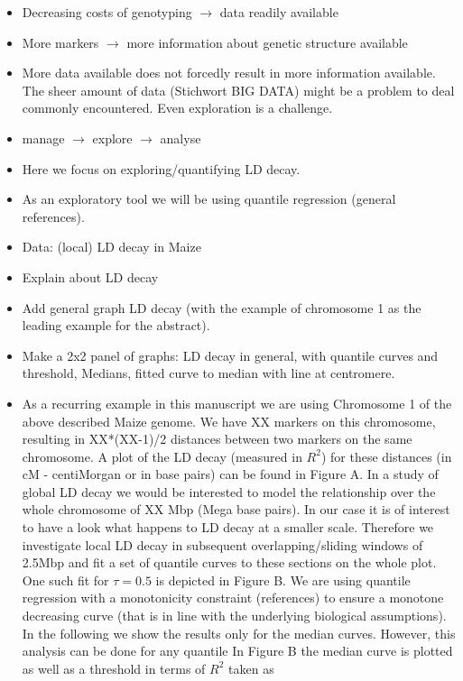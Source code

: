 \documentclass[twoside]{report}
\begin{document}
\begin{itemize}
\item Decreasing costs of genotyping $\rightarrow$ data readily available 
\item More markers $\rightarrow$ more information about genetic structure available
\item More data available does not forcedly result in more information available. The sheer 
	amount of data 
	(Stichwort BIG DATA) might be a problem to deal commonly encountered. Even exploration is 
	a challenge.
\item manage $\rightarrow$ explore $\rightarrow$ analyse
\item Here we focus on exploring/quantifying LD decay.
\item As an exploratory tool we will be using quantile regression (general references).
\item Data: (local) LD decay in Maize
\item Explain about LD decay
\item Add general graph LD decay (with the example of chromosome 1 as the leading example for 
	the abstract).
\item Make a 2x2 panel of graphs: LD decay in general, with quantile curves and threshold, 
	Medians, fitted curve to median with line at centromere.
\item As a recurring example in this manuscript we are using Chromosome 1 of the above described 
	Maize genome. We have XX markers on this chromosome, resulting in XX*(XX-1)/2 distances 
	between two markers on the same chromosome. A plot of the LD decay (measured in $R^2$) 
	for these distances (in cM - centiMorgan or in base pairs) can be found in Figure A. In a study of global 
	LD decay we would be interested to model the relationship over the whole chromosome of 
	XX Mbp (Mega base pairs). In our case it is of interest to have a look what happens to 
	LD decay at a smaller scale. Therefore we investigate local LD decay in subsequent 
	overlapping/sliding windows of 2.5Mbp and fit a set of quantile curves to these 
	sections on the whole plot. One such fit for $\tau = 0.5$ is depicted in Figure B. 
	We are using quantile 
	regression with a monotonicity constraint (references) 
	to ensure a monotone decreasing curve (that is 
	in line with the underlying biological assumptions). In the following we show the 
	results only for the median curves. However, this analysis can be done for any quantile  
	In Figure B the median curve is plotted as well as a threshold in terms of $R^2$ taken as 

\end{itemize}
\end{document}
